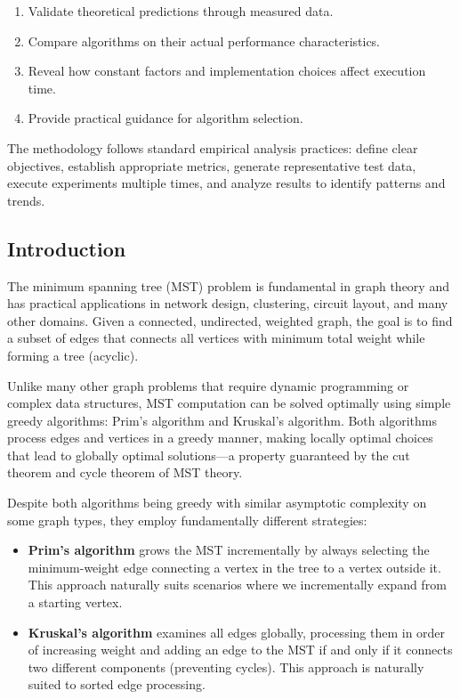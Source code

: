 \documentclass{labreport}
\begin{document}
\begin{enumerate}
    \item Validate theoretical predictions through measured data.
    \item Compare algorithms on their actual performance characteristics.
    \item Reveal how constant factors and implementation choices affect execution time.
    \item Provide practical guidance for algorithm selection.
\end{enumerate}

The methodology follows standard empirical analysis practices: define clear objectives, establish appropriate metrics, generate representative test data, execute experiments multiple times, and analyze results to identify patterns and trends.

\subsection{Introduction}

The minimum spanning tree (MST) problem is fundamental in graph theory and has practical applications in network design, clustering, circuit layout, and many other domains. Given a connected, undirected, weighted graph, the goal is to find a subset of edges that connects all vertices with minimum total weight while forming a tree (acyclic).

Unlike many other graph problems that require dynamic programming or complex data structures, MST computation can be solved optimally using simple greedy algorithms: Prim's algorithm and Kruskal's algorithm. Both algorithms process edges and vertices in a greedy manner, making locally optimal choices that lead to globally optimal solutions---a property guaranteed by the cut theorem and cycle theorem of MST theory.

Despite both algorithms being greedy with similar asymptotic complexity on some graph types, they employ fundamentally different strategies:

\begin{itemize}
    \item \textbf{Prim's algorithm} grows the MST incrementally by always selecting the minimum-weight edge connecting a vertex in the tree to a vertex outside it. This approach naturally suits scenarios where we incrementally expand from a starting vertex.
    
    \item \textbf{Kruskal's algorithm} examines all edges globally, processing them in order of increasing weight and adding an edge to the MST if and only if it connects two different components (preventing cycles). This approach is naturally suited to sorted edge processing.
\end{itemize}
\end{document}
